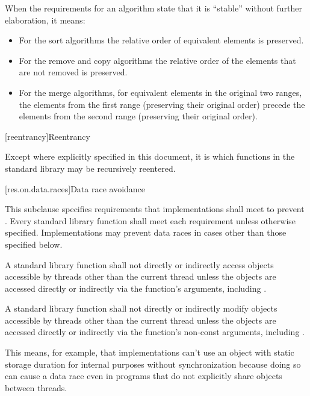 \pnum
{}%
%
When the requirements for an algorithm state that it is ``stable'' without further elaboration,
it means:
\begin{itemize}
\item For the sort algorithms the relative order of equivalent
elements is preserved.

\item For the remove and copy algorithms the relative order of
the elements that are not removed is preserved.

\item For the merge algorithms, for equivalent elements in
the original two ranges, the elements from the first range (preserving their
original order) precede the elements from the second range (preserving their
original order).
\end{itemize}

[reentrancy]{Reentrancy}

\pnum
Except where explicitly specified in this document, it is  which functions in the \Cpp{} standard
library may be recursively reentered.

[res.on.data.races]{Data race avoidance}

\pnum
This subclause specifies requirements that implementations shall meet to prevent
.
Every standard library function shall meet each requirement unless otherwise specified.
Implementations may prevent data races in cases other than those specified below.

\pnum
A \Cpp{} standard library function shall not directly or indirectly access
objects accessible by threads other than the current thread
unless the objects are accessed directly or indirectly via the function's arguments,
including .

\pnum
A \Cpp{} standard library function shall not directly or indirectly modify
objects accessible by threads other than the current thread
unless the objects are accessed directly or indirectly via the function's non-const
arguments, including .

\pnum
\begin{note}
This means, for example, that implementations can't use an object with static storage duration for
internal purposes without synchronization because doing so can cause a data race even in
programs that do not explicitly share objects between threads.
\end{note}

